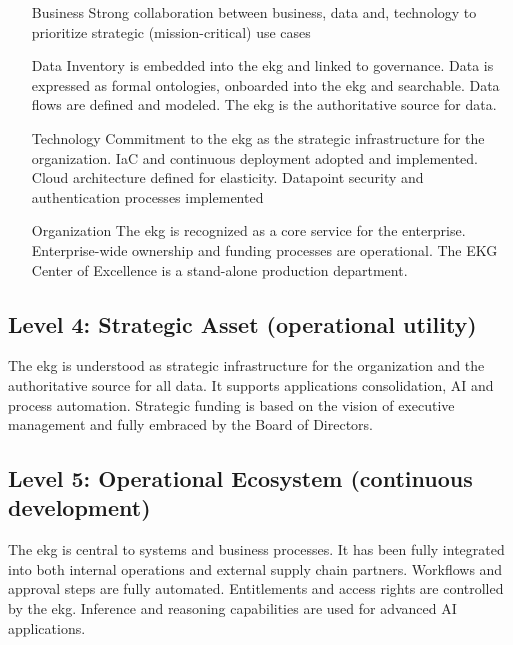 \begin{itemize}[leftmargin=1in,font=\bfseries]

    \item[Business]     Strong collaboration between business, data and, technology to prioritize strategic
                        (mission-critical) use cases
    \item[Data]         Inventory is embedded into the \gls{ekg} and linked to governance.
                        Data is expressed as formal ontologies, onboarded into the \gls{ekg} and searchable.
                        Data flows are defined and modeled.
                        The \gls{ekg} is the authoritative source for data.
    \item[Technology]   Commitment to the \gls{ekg} as the strategic infrastructure for the organization.
                        IaC and continuous deployment adopted and implemented.
                        Cloud architecture defined for elasticity.
                        Datapoint security and authentication processes implemented
    \item[Organization] The \gls{ekg} is recognized as a core service for the enterprise.
                        Enterprise-wide ownership and funding processes are operational.
                        The EKG Center of Excellence is a stand-alone production department.

\end{itemize}

\subsection{Level 4: Strategic Asset (operational utility)}

The \gls{ekg} is understood as strategic infrastructure for the organization and the authoritative source
for all data.
It supports applications consolidation, AI and process automation.
Strategic funding is based on the vision of executive management and fully embraced by the Board of Directors.

\subsection{Level 5: Operational Ecosystem (continuous development)}

The \gls{ekg} is central to systems and business processes.
It has been fully integrated into both internal operations and external supply chain partners.
Workflows and approval steps are fully automated.
Entitlements and access rights are controlled by the \gls{ekg}.
Inference and reasoning capabilities are used for advanced AI applications.

